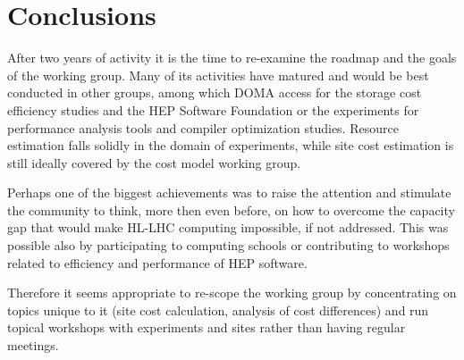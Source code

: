\section{Conclusions}
After two years of activity it is the time to re-examine the roadmap
and the goals of the working group. Many of its activities have
matured and would be best conducted in other groups, among which DOMA
access for the storage cost efficiency studies and the HEP Software
Foundation or the experiments for performance analysis tools and
compiler optimization studies.  Resource estimation falls solidly in
the domain of experiments, while site cost estimation is still ideally
covered by the cost model working group.

Perhaps one of the biggest achievements was to raise the attention and
stimulate the community to think, more then even before, on how to
overcome the capacity gap that would make HL-LHC computing impossible,
if not addressed. This was possible also by participating to computing
schools or contributing to workshops related to efficiency and
performance of HEP software.

Therefore it seems appropriate to re-scope the working group by
concentrating on topics unique to it (site cost calculation, analysis
of cost differences) and run topical workshops with experiments and
sites rather than having regular meetings.
